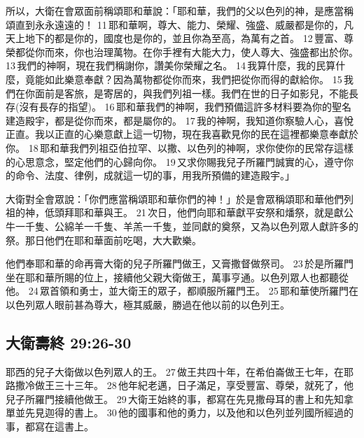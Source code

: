 所以，大衛在會眾面前稱頌耶和華說：「耶和華，我們的父以色列的神，是應當稱頌直到永永遠遠的！ 11 耶和華啊，尊大、能力、榮耀、強盛、威嚴都是你的，凡天上地下的都是你的，國度也是你的，並且你為至高，為萬有之首。 12 豐富、尊榮都從你而來，你也治理萬物。在你手裡有大能大力，使人尊大、強盛都出於你。 13 我們的神啊，現在我們稱謝你，讚美你榮耀之名。 14 我算什麼，我的民算什麼，竟能如此樂意奉獻？因為萬物都從你而來，我們把從你而得的獻給你。 15 我們在你面前是客旅，是寄居的，與我們列祖一樣。我們在世的日子如影兒，不能長存(沒有長存的指望)。 16 耶和華我們的神啊，我們預備這許多材料要為你的聖名建造殿宇，都是從你而來，都是屬你的。 17 我的神啊，我知道你察驗人心，喜悅正直。我以正直的心樂意獻上這一切物，現在我喜歡見你的民在這裡都樂意奉獻於你。 18 耶和華我們列祖亞伯拉罕、以撒、以色列的神啊，求你使你的民常存這樣的心思意念，堅定他們的心歸向你。 19 又求你賜我兒子所羅門誠實的心，遵守你的命令、法度、律例，成就這一切的事，用我所預備的建造殿宇。」

大衛對全會眾說：「你們應當稱頌耶和華你們的神！」於是會眾稱頌耶和華他們列祖的神，低頭拜耶和華與王。 21 次日，他們向耶和華獻平安祭和燔祭，就是獻公牛一千隻、公綿羊一千隻、羊羔一千隻，並同獻的奠祭，又為以色列眾人獻許多的祭。那日他們在耶和華面前吃喝，大大歡樂。

他們奉耶和華的命再膏大衛的兒子所羅門做王，又膏撒督做祭司。 23 於是所羅門坐在耶和華所賜的位上，接續他父親大衛做王，萬事亨通。以色列眾人也都聽從他。 24 眾首領和勇士，並大衛王的眾子，都順服所羅門王。 25 耶和華使所羅門在以色列眾人眼前甚為尊大，極其威嚴，勝過在他以前的以色列王。


\subsection{大衛壽終 29:26-30 }
耶西的兒子大衛做以色列眾人的王。 27 做王共四十年，在希伯崙做王七年，在耶路撒冷做王三十三年。 28 他年紀老邁，日子滿足，享受豐富、尊榮，就死了，他兒子所羅門接續他做王。 29 大衛王始終的事，都寫在先見撒母耳的書上和先知拿單並先見迦得的書上。 30 他的國事和他的勇力，以及他和以色列並列國所經過的事，都寫在這書上。







